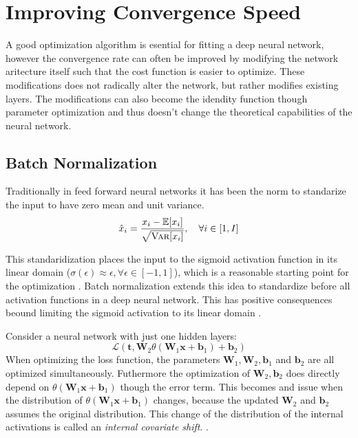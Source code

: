 \section{Improving Convergence Speed}

A good optimization algorithm is esential for fitting a deep neural network, however the convergence rate can often be improved by modifying the network aritecture itself such that the cost function is easier to optimize. These modifications does not radically alter the network, but rather modifies existing layers. The modifications can also become the idendity function though parameter optimization and thus doesn't change the theoretical capabilities of the neural network.

\subsection{Batch Normalization}
Traditionally in feed forward neural networks it has been the norm to standarize the input to have zero mean and unit variance.
\begin{equation}
\hat{x}_i = \frac{x_i - \mathbb{E}[x_i]}{\sqrt{\textsc{Var}[x_i]}}, \quad \forall i \in [1, I]
\end{equation}

This standaridization places the input to the sigmoid activation function in its linear domain ($\sigma(\epsilon) \approx \epsilon, \forall \epsilon \in [-1, 1]$), which is a reasonable starting point for the optimization . Batch normalization extends this idea to standardize before all activation functions in a deep neural network. This has positive consequences beound limiting the sigmoid activation to its linear domain \cite{batch-normalization}.

Consider a neural network with just one hidden layers:
\begin{equation}
\mathcal{L}(\mathbf{t}, \mathbf{W}_2 \theta(\mathbf{W}_1 \mathbf{x} + \mathbf{b}_1) + \mathbf{b}_2)
\end{equation}
When optimizing the loss function, the parameters $\mathbf{W}_1, \mathbf{W}_2, \mathbf{b}_1$ and $\mathbf{b}_2$ are all optimized simultaneously. Futhermore the optimization of $\mathbf{W}_2, \mathbf{b}_2$ does directly depend on $\theta(\mathbf{W}_1 \mathbf{x} + \mathbf{b}_1)$ though the error term. This becomes and issue when the distribution of $\theta(\mathbf{W}_1 \mathbf{x} + \mathbf{b}_1)$ changes, because the updated $\mathbf{W}_2$ and $\mathbf{b}_2$ assumes the original distribution. This change of the distribution of the internal activations is called an \textit{internal covariate shift}. \cite{batch-normalization}.

